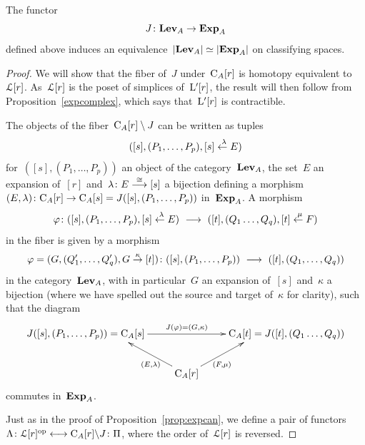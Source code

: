 \begin{proposition}\label{prop:levexp}
The  functor
\[
J\colon\Lev_A\to\Exp_A   %
\]
defined above induces an equivalence~$|\mathbf{Lev}_A|\simeq |\mathbf{Exp}_A|$ on classifying spaces.
\end{proposition}

\begin{proof}
We will show that the fiber of~$J$ under~$\mathrm{C}_A[r]$ is homotopy equivalent to~$\mathcal{L}[r]$. As~$\mathcal{L}[r]$ is the poset of simplices of~$\mathrm{L}'[r]$, the result will then follow from Proposition~\ref{expcomplex}, which says that~$\mathrm{L}'[r]$ is contractible. 

The objects of the fiber~$\mathrm{C}_A[r]\setminus J$ can be written as tuples 
$$([s],(P_1,\dots,P_p), [s] \stackrel{\ \lambda}{\leftarrow} E)$$ 
for~$([s],(P_1,\dots,P_p))$ an object of the category~$\mathbf{Lev}_A$, the set~$E$ an expansion of~$[r]$ and~$\lambda\colon E\stackrel{\cong}{\longrightarrow} [s]$ a bijection defining a morphism 
$(E,\lambda)\colon \mathrm{C}_A[r]\to \mathrm{C}_A[s]=J([s],(P_1,\dots,P_p))$ in~$\mathbf{Exp}_A$. 
A morphism 
$$\varphi\colon([s],(P_1,\dots,P_p), [s]\stackrel{\ \lambda}{\leftarrow} E)\ \longrightarrow \ ([t],(Q_1\dots,Q_q), [t]\stackrel{\ \mu}{\leftarrow} F)$$ 
in the fiber is given by a morphism
\[
\varphi=(G,(Q_1',\dots,Q'_q),G\stackrel{\kappa}\to [t])\colon([s],(P_1,\dots,P_p))\ \longrightarrow \ ([t],(Q_1,\dots,Q_q))
\]
in the category~$\mathbf{Lev}_A$, with in particular~$G$ an expansion of~$[s]$ and~$\kappa$ a bijection (where we have spelled out the source and target of~$\kappa$ for clarity), such that the diagram 
$$\xymatrix{J([s],(P_1,\dots,P_p))=\rmC_A[s] \ar[rr]^-{J(\phi)=(G,\kappa)}&& \rmC_A[t]=J([t],(Q_1\dots,Q_q)) \\
&\rmC_A[r] \ar[ul]+<10ex,-2ex>^{(E,\la)} \ar[ur]+<-10ex,-2ex>_{(F,\mu)}&}$$
commutes in~$\mathbf{Exp}_A$. 

Just as in the proof of Proposition~\ref{prop:expcan}, we define a pair of functors~$\Lambda\colon\mathcal{L}[r]^{\operatorname{op}}\longleftrightarrow \mathrm{C}_A[r]\backslash J\colon\Pi$, where the order of~$\mathcal{L}[r]$ is reversed. 


\end{proof}
